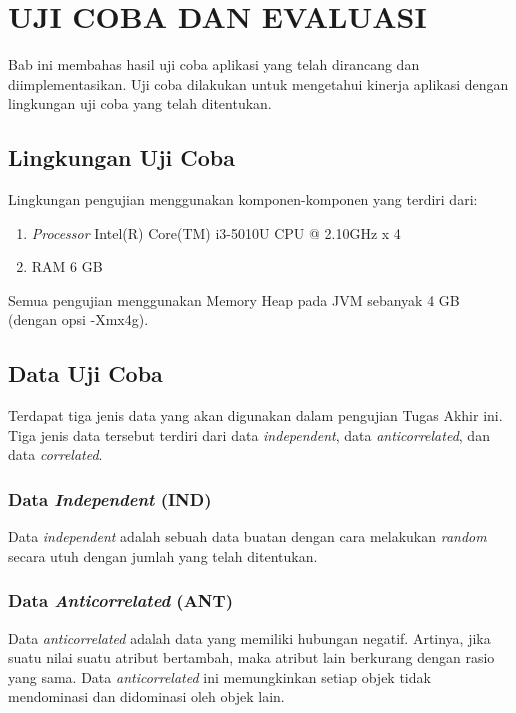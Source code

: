 \chapter{UJI COBA DAN EVALUASI}\label{chap:uji-coba-eval}

\tab Bab ini membahas hasil uji coba aplikasi yang telah dirancang dan diimplementasikan. Uji coba dilakukan untuk mengetahui kinerja aplikasi dengan lingkungan uji coba yang telah ditentukan.

\section{Lingkungan Uji Coba}

Lingkungan pengujian menggunakan komponen-komponen yang terdiri dari:

\begin{enumerate}
	\item \textit{Processor} Intel(R) Core(TM) i3-5010U CPU @ 2.10GHz x 4
	\item RAM 6 GB
\end{enumerate}

Semua pengujian menggunakan Memory Heap pada JVM sebanyak 4 GB (dengan opsi -Xmx4g).

\section{Data Uji Coba}

\tab Terdapat tiga jenis data yang akan digunakan dalam pengujian Tugas Akhir ini. Tiga jenis data tersebut terdiri dari data \textit{independent}, data \textit{anticorrelated}, dan data \textit{correlated}.

\subsection{Data \textit{Independent} (IND)}

\tab Data \textit{independent} adalah sebuah data buatan dengan cara melakukan \textit{random} secara utuh dengan jumlah yang telah ditentukan.

\subsection{Data \textit{Anticorrelated} (ANT)}

\tab Data \textit{anticorrelated} adalah data yang memiliki hubungan negatif. Artinya, jika suatu nilai suatu atribut bertambah, maka atribut lain berkurang dengan rasio yang sama. Data \textit{anticorrelated} ini memungkinkan setiap objek tidak mendominasi dan didominasi oleh objek lain.

